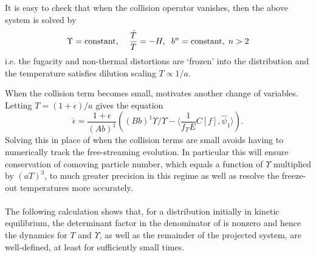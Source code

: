  It is easy to check that when the collision operator vanishes, then the above system is solved by 
\begin{equation}\label{free_stream_sol}
\Upsilon=\text{constant},\hspace{4mm} \frac{\dot T}{T}=-H,\hspace{2mm}  b^n=\text{constant},\hspace{1mm} n>2
\end{equation}
i.e. the fugacity and non-thermal distortions are `frozen' into the distribution and the temperature satisfies dilution scaling $T\propto 1/a$.

When the collision term becomes small,  motivates another change of variables. Letting $T=(1+\epsilon)/a$  gives the equation
\begin{equation}
\dot\epsilon=\frac{1+\epsilon}{(Ab)^1}\left((Bb)^1\dot{\Upsilon}/\Upsilon-\langle\frac{1}{f_\Upsilon E}C[f],\hat\psi_1\rangle\right).
\end{equation}
Solving this in place of  when the collision terms are small avoids having to numerically track the free-streaming evolution.  In particular this will ensure conservation of comoving particle number, which equals a function of $\Upsilon$ multiplied by $(aT)^3$, to much greater precision in this regime as well as resolve the freeze-out temperatures more accurately.\\

\\
The following calculation shows that, for a distribution initially in kinetic equilibrium, the determinant factor in the denominator of  is nonzero and hence the dynamics for $T$ and $\Upsilon$, as well as the remainder of the projected system, are well-defined, at least for sufficiently small times. 

